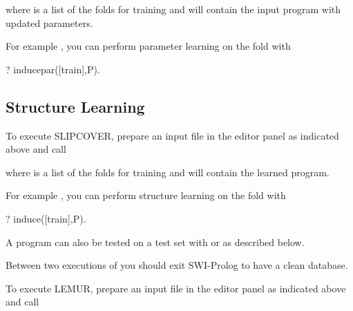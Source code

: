 \documentclass[letterpaper,10pt,english]{sphinxmanual}
\begin{document}
where  is a list of the folds for training and  will contain the input program with updated parameters.

For example , you can perform parameter learning on the  fold with

\begin{sphinxVerbatim}[commandchars=\\\{\}]
?\PYGZhy{} induce\PYGZus{}par([train],P).
\end{sphinxVerbatim}


\subsection{Structure Learning}
\label{\detokenize{index:structure-learning}}
To execute SLIPCOVER, prepare an input file in the editor panel as indicated above and call

\begin{sphinxVerbatim}[commandchars=\\\{\}]
  
\end{sphinxVerbatim}

where  is a list of the folds for training and  will contain the learned program.

For example , you can perform structure learning on the  fold with

\begin{sphinxVerbatim}[commandchars=\\\{\}]
?\PYGZhy{} induce([train],P).
\end{sphinxVerbatim}

A program can also be tested on a test set with  or  as described below.

Between two executions of  you should exit SWI-Prolog to have a clean database.

To execute LEMUR, prepare an input file in the editor panel as indicated above and call
\end{document}
